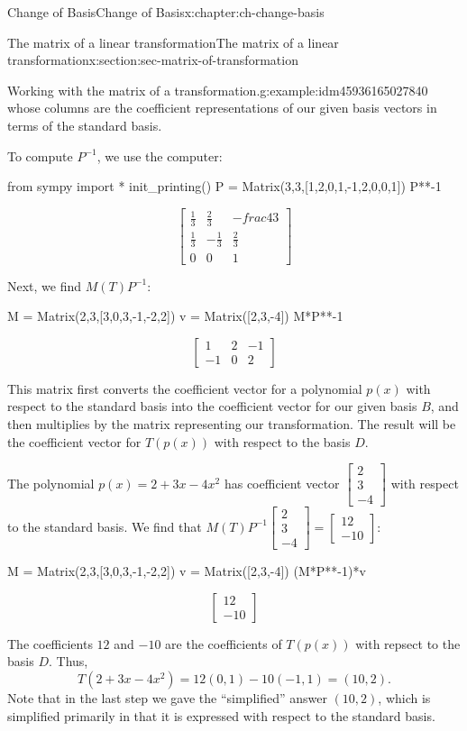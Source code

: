 \documentclass[oneside,10pt,]{book}
\numberwithin{equation}{section}
\newcommand{\bbm}{\begin{bmatrix}}
\newcommand{\ebm}{\end{bmatrix}}
\newcommand{\amp}{&}
\begin{document}
\begin{chapterptx}{Change of Basis}{}{Change of Basis}{}{}{x:chapter:ch-change-basis}
\begin{sectionptx}{The matrix of a linear transformation}{}{The matrix of a linear transformation}{}{}{x:section:sec-matrix-of-transformation}
\begin{example}{Working with the matrix of a transformation.}{g:example:idm45936165027840}
whose columns are the coefficient representations of our given basis vectors in terms of the standard basis.%
\par
To compute \(P^{-1}\), we use the computer:%
\begin{sageinput}
from sympy import *
init_printing()
P = Matrix(3,3,[1,2,0,1,-1,2,0,0,1])
P**-1
\end{sageinput}
\begin{sageoutput}
\[\bbm \frac13\amp \frac23\amp -frac43\\ \frac13\amp -\frac13 \amp \frac23\\0\amp 0\amp 1\ebm\]
\end{sageoutput}
Next, we find \(M(T)P^{-1}\):%
\begin{sageinput}
M = Matrix(2,3,[3,0,3,-1,-2,2])
v = Matrix([2,3,-4])
M*P**-1
\end{sageinput}
\begin{sageoutput}
\[\bbm 1\amp 2\amp -1\\-1\amp 0\amp 2\ebm\]
\end{sageoutput}
This matrix first converts the coefficient vector for a polynomial \(p(x)\) with respect to the standard basis into the coefficient vector for our given basis \(B\), and then multiplies by the matrix representing our transformation. The result will be the coefficient vector for \(T(p(x))\) with respect to the basis \(D\).%
\par
The polynomial \(p(x) = 2+3x-4x^2\) has coefficient vector \(\bbm 2\\3\\-4\ebm\) with respect to the standard basis. We find that \(M(T)P^{-1}\bbm 2\\3\\-4\ebm = \bbm 12\\-10\ebm\):%
\begin{sageinput}
M = Matrix(2,3,[3,0,3,-1,-2,2])
v = Matrix([2,3,-4])
(M*P**-1)*v
\end{sageinput}
\begin{sageoutput}
\[\bbm 12\\-10\ebm\]
\end{sageoutput}
The coefficients \(12\) and \(-10\) are the coefficients of \(T(p(x))\) with repsect to the basis \(D\). Thus,%
\begin{equation*}
T(2+3x-4x^2) = 12(0,1)-10(-1,1) = (10,2)\text{.}
\end{equation*}
Note that in the last step we gave the ``simplified'' answer \((10,2)\), which is simplified primarily in that it is expressed with respect to the standard basis.%

\end{example}
\end{sectionptx}
\end{chapterptx}
\end{document}
